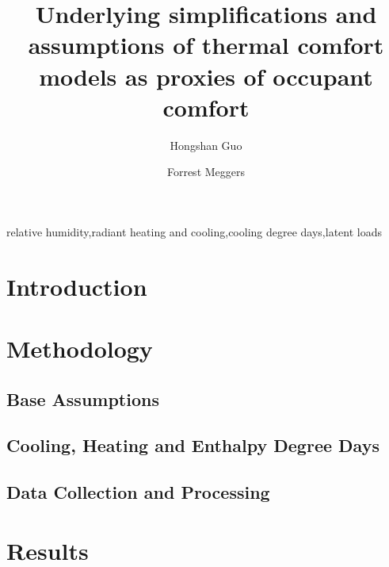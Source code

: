 \documentclass[review]{elsarticle}
\begin{document}
\begin{frontmatter}
\title{Underlying simplifications and assumptions of thermal comfort models as proxies of occupant comfort}
\author[mysecondaryaddress]{Hongshan Guo}
\author[mymainaddress,mysecondaryaddress]{Forrest Meggers}
\address[mymainaddress]{School of Architecture, Princeton University, USA}
\address[mysecondaryaddress]{Andlinger Center for Energy and the Environment, Princeton University, USA.}
\begin{abstract}

\end{abstract}
\begin{keyword}relative humidity\sep radiant heating and cooling\sep cooling degree days\sep latent loads\end{keyword}\end{frontmatter}
\tableofcontents
\section{Introduction}

\section{Methodology}
    \subsection{Base Assumptions}
            
    \subsection{Cooling, Heating and Enthalpy Degree Days}
        
    \subsection{Data Collection and Processing}
        
\section{Results}
    \subsection{}
    
\end{document}
